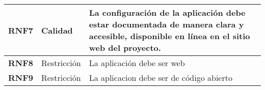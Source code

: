 \begin{longtable}{|l|l|p{12cm}|}
    \textbf{RNF7}   & Calidad            & La configuración de la aplicación debe estar documentada de manera clara y accesible, disponible en línea en el sitio web del proyecto.            \\ \hline
    \textbf{RNF8}   & Restricción        & La aplicación debe ser web                                                                                                                         \\ \hline
    \textbf{RNF9}   & Restricción        & La aplicacion debe ser de código abierto                                                                                                           \\ \hline
\end{longtable}
